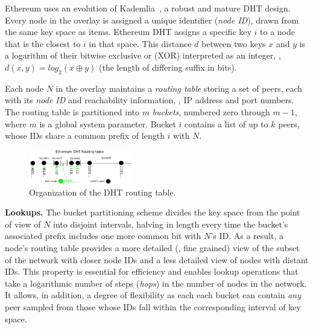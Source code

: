 Ethereum uses an evolution of Kademlia~\cite{maymounkov2002kademlia}, a robust and mature DHT design. %
Every node in the overlay is assigned a unique identifier (\emph{node ID}), drawn from the same key space as items.
Ethereum DHT assigns a specific key $i$ to a node that is the closest to $i$ in that space.
This distance $d$ between two keys $x$ and $y$ is a logarithm of their bitwise exclusive or (XOR) interpreted as an integer, \ie, $d(x,y) = \textit{log}_2(x \oplus y)$ (\ie the length of differing suffix in bits).

Each node $N$ in the overlay maintains a \emph{routing table} storing a set of peers, each with its \emph{node ID} and reachability information, \ie, IP address and port numbers.
The routing table is partitioned into $m$ \textit{buckets}, numbered zero through $m-1$, where $m$ is a global system parameter.
Bucket $i$ contains a list of up to $k$ peers, whose IDs share a common prefix of length $i$ with $N$.


\begin{figure}
    \includegraphics[width=0.4\textwidth]{img/kademlia}
    \caption{Organization of the DHT routing table.}
    \label{fig:kademlia}
 \end{figure}

\smallskip
\noindent
\textbf{Lookups.}
%
The bucket partitioning scheme divides the key space from the point of view of $N$ into disjoint intervals, halving in length every time the bucket's associated prefix includes one more common bit with $N$'s ID.
As a result, a node's routing table provides a more detailed (\ie, fine grained) view of the subset of the network with closer node IDs and a less detailed view of nodes with distant IDs.
This property is essential for efficiency and enables lookup operations that take a logarithmic number of steps (\emph{hops}) in the number of nodes in the network.
It allows, in addition, a degree of flexibility as each each bucket can contain \textit{any} peer sampled from those whose IDs fall within the corresponding interval of key space.

